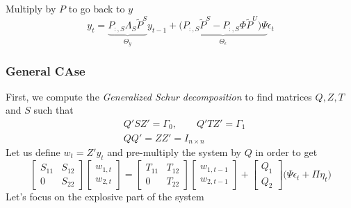 \documentclass[a4paper,10pt]{article}  %
\begin{document}
Multiply by $ P $ to go back to $ y $
\begin{equation}
   \label{eq:system2_simul}
   y_t = \underbrace{P_{:,S} \Lambda_S \tilde{P}^S}_{ \Theta_y } y_{t-1} + 
         \underbrace{\Big( P_{:,S} \tilde{P}^S - P_{:,S} \Phi \tilde{P}^U \Big) \Psi}
         _{\Theta_{\epsilon}} \epsilon_t
\end{equation}


\subsubsection{General CAse} %
\label{sub:general_case}
First, we compute the \emph{Generalized Schur decomposition} to find matrices $ Q,Z,T $ and $ S $ such that
\begin{align}
   & Q' S Z' = \Gamma_0, \qquad Q' T Z' = \Gamma_1 \\
   & QQ' = ZZ' = I_{n\times n}
\end{align}
Let us define $ w_t = Z'y_t $ and pre-multiply the system by $ Q $ in order to get
\begin{equation}
   \label{eq:QZsims_eq01}
   \begin{bmatrix}
      S_{11} & S_{12} \\ 0 & S_{22}
   \end{bmatrix}   
   \begin{bmatrix}
      w_{1,t} \\ w_{2,t}
   \end{bmatrix} = 
   \begin{bmatrix}
      T_{11} & T_{12} \\ 0 & T_{22}
   \end{bmatrix}
   \begin{bmatrix}
      w_{1,t-1} \\ w_{2,t-1}
   \end{bmatrix} +
   \begin{bmatrix}
      Q_1 \\ Q_2
   \end{bmatrix}
   \Big( \Psi \epsilon_t + \Pi \eta_t \Big) 
\end{equation}
Let's focus on the explosive part of the system 
\end{document}
